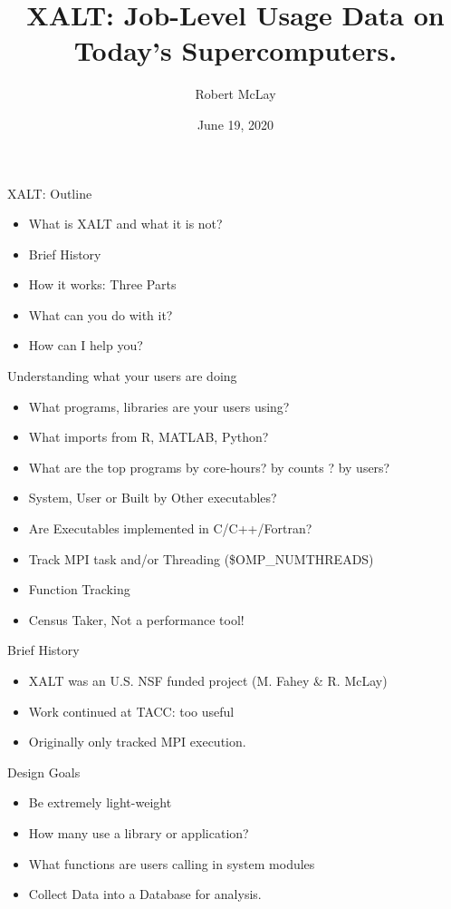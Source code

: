 \documentclass{beamer}
\begin{document}
\title[XALT]{XALT: Job-Level Usage Data on Today's Supercomputers.}
\author{Robert McLay} 
\date{June 19, 2020} 

\frame{\titlepage} 

\begin{frame}{XALT: Outline}
  \begin{itemize}
    \item What is XALT and what it is not?
    \item Brief History
    \item How it works: Three Parts
    \item What can you do with it?
    \item How can I help you?
  \end{itemize}
\end{frame}

\begin{frame}{Understanding what your users are doing}
  \begin{itemize}
    \item What programs, libraries are your users using?
    \item What imports from R, MATLAB, Python?
    \item What are the top programs by core-hours? by counts ? by users?
    \item System, User or Built by Other executables?
    \item Are Executables implemented in C/C++/Fortran?
    \item Track MPI task and/or Threading (\$OMP\_NUMTHREADS)
    \item Function Tracking
    \item Census Taker, Not a performance tool!
  \end{itemize}
\end{frame}

\begin{frame}{Brief History}
  \begin{itemize}
    \item XALT was an U.S. NSF funded project (M. Fahey \& R. McLay)
    \item Work continued at TACC: too useful
    \item Originally only tracked MPI execution.
  \end{itemize}
\end{frame}

\begin{frame}{Design Goals}
  \begin{itemize}
    \item Be extremely light-weight
    \item How many use a library or application?
    \item What functions are users calling in system modules
    \item Collect Data into a Database for analysis.
  \end{itemize}
\end{frame}
\end{document}
